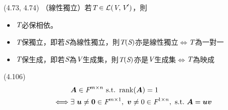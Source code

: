 \item \begin{theorem}{(4.73, 4.74)} （線性獨立）若$\textit{T} \in \mathcal{L}(\textit{V}, \textit{V}')$，則
	\begin{itemize}
		\item $\textit{T}$必保相依。
		\item $\textit{T}$保獨立，即若$\textit{S}$為線性獨立，則$\textit{T}(\textit{S})$亦是線性獨立$\iff$$\textit{T}$為一對一
		\item $\textit{T}$保生成，即若$\textit{S}$為$\textit{V}$生成集，則$\textit{T}(\textit{S})$亦是$\textit{V}$生成集$\iff$$\textit{T}$為映成
	\end{itemize}
\end{theorem}

\item \begin{theorem}{(4.106)} \quad\quad \begin{equation}
		\begin{aligned}
			& \mat{A} \in \F^{m \times n} \ \text{s.t.} \ \rnk(\mat{A}) = 1 \\ 
			\iff & \exists \ \vec{u} \neq \vec{0} \in \F^{m \times 1}, \ \vec{v} \neq 0 \in \F^{1 \times n}, \ \text{s.t.} \ \mat{A} = \vec{uv}	
		\end{aligned}
	\end{equation}
\end{theorem}

